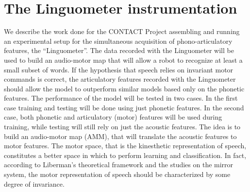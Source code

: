\section{The Linguometer instrumentation}

\label{ch:linguometer:instrumentation}

We describe the work done for the CONTACT
Project assembling and running an experimental setup for the simultaneous 
acquisition of phono-articulatory features, the ``Linguometer''.
The data recorded with the Linguometer will be used to build an audio-motor map 
that will allow a robot to recognize at least a small subset of words.
If the hypothesis that speech relies on invariant motor commands is correct, 
the articulatory features recorded with the Linguometer should allow the
model to outperform similar models based only on the phonetic features.
The performance of the model will be tested in two cases.
In the first case training and testing will be done using just phonetic
features. In the second case, both phonetic and articulatory (motor) features
will be used during training, while testing will still rely on just the acoustic
features.
The idea is to build an audio-motor map (AMM), that will translate the acoustic 
features to motor features. 
The motor space, that is the kinesthetic representation of speech, constitutes
a better space in which to perform learning and classification.
In fact, according to Liberman's theoretical framework and the
studies on the mirror system, the motor representation of speech should be 
characterized by some degree of invariance.

